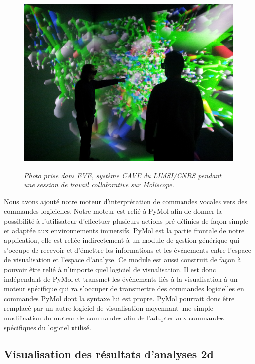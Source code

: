 \begin{figure}
  \centering
  {\includegraphics[width=.75\linewidth]{./figures/ch5/multi_collaboratif}}
    \caption{{\it Photo prise dans EVE, système CAVE du LIMSI/CNRS pendant une session de travail collaborative sur Moliscope.}}
  \label{Fig:multi_collaboratif}
  \hspace{0.3cm}
\end{figure}

Nous avons ajouté notre moteur d'interprétation de commandes vocales vers des commandes logicielles. Notre moteur est relié à PyMol afin de donner la possibilité à l'utilisateur d'effectuer plusieurs actions pré-définies de façon simple et adaptée aux environnements immersifs.
PyMol est la partie frontale de notre application, elle est reliée indirectement à un module de gestion générique qui s'occupe de recevoir et d'émettre les informations et les événements entre l'espace de visualisation et l'espace d'analyse. Ce module est aussi construit de façon à pouvoir être relié à n'importe quel logiciel de visualisation. Il est donc indépendant de PyMol et transmet les événements liés à la visualisation à un moteur spécifique qui va s'occuper de transmettre des commandes logicielles en commandes PyMol dont la syntaxe lui est propre. PyMol pourrait donc être remplacé par un autre logiciel de visualisation moyennant une simple modification du moteur de commandes afin de l'adapter aux commandes spécifiques du logiciel utilisé.

\subsection{Visualisation des résultats d'analyses 2d}

